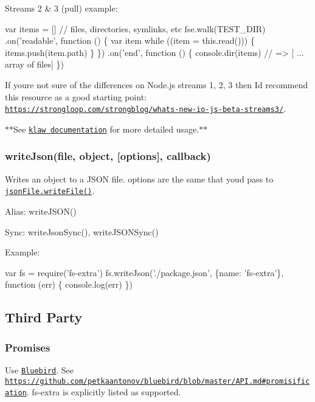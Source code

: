 Streams 2 \& 3 (pull) example\+:


\begin{DoxyCode}
var items = [] // files, directories, symlinks, etc
fse.walk(TEST\_DIR)
  .on('readable', function () \{
    var item
    while ((item = this.read())) \{
      items.push(item.path)
    \}
  \})
  .on('end', function () \{
    console.dir(items) // => [ ... array of files]
  \})
\end{DoxyCode}


If you\textquotesingle{}re not sure of the differences on Node.\+js streams 1, 2, 3 then I\textquotesingle{}d recommend this resource as a good starting point\+: \href{https://strongloop.com/strongblog/whats-new-io-js-beta-streams3/}{\tt https\+://strongloop.\+com/strongblog/whats-\/new-\/io-\/js-\/beta-\/streams3/}.

$\ast$$\ast$\+See \href{https://github.com/jprichardson/node-klaw}{\tt {\ttfamily klaw} documentation} for more detailed usage.$\ast$$\ast$

\subsubsection*{write\+Json(file, object, \mbox{[}options\mbox{]}, callback)}

Writes an object to a J\+S\+ON file. {\ttfamily options} are the same that you\textquotesingle{}d pass to \href{https://github.com/jprichardson/node-jsonfile#writefilefilename-options-callback}{\tt {\ttfamily json\+File.\+write\+File()}}.

Alias\+: {\ttfamily write\+J\+S\+O\+N()}

Sync\+: {\ttfamily write\+Json\+Sync()}, {\ttfamily write\+J\+S\+O\+N\+Sync()}

Example\+:


\begin{DoxyCode}
var fs = require('fs-extra')
fs.writeJson('./package.json', \{name: 'fs-extra'\}, function (err) \{
  console.log(err)
\})
\end{DoxyCode}


\subsection*{Third Party }

\subsubsection*{Promises}

Use \href{https://github.com/petkaantonov/bluebird}{\tt Bluebird}. See \href{https://github.com/petkaantonov/bluebird/blob/master/API.md#promisification}{\tt https\+://github.\+com/petkaantonov/bluebird/blob/master/\+A\+P\+I.\+md\#promisification}. {\ttfamily fs-\/extra} is explicitly listed as supported.


